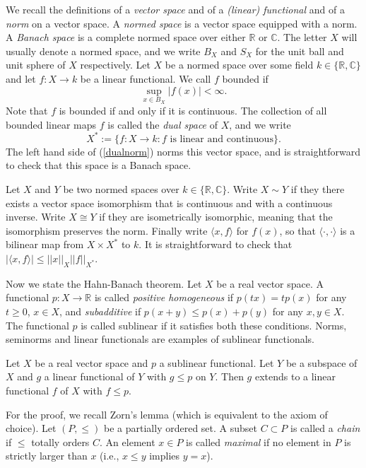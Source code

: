 We recall the definitions of a \emph{vector space} and of a \emph{(linear) functional} and of a \emph{norm} on a vector space.
A \emph{normed space} is a vector space equipped with a norm.
A \emph{Banach space} is a complete normed space over either $\mathbb{R}$ or $\mathbb{C}$.
The letter $X$ will usually denote a normed space,
and we write $B_X$ and $S_X$ for the unit ball and unit sphere of $X$ respectively.
Let $X$ be a normed space over some field $k\in\{\mathbb{R},\mathbb{C}\}$
and let $f:X\to k$ be a linear functional.
We call $f$ bounded if
\begin{equation}
  \sup_{x\in B_X}|f(x)|<\infty.
  \label{dualnorm}
\end{equation}
Note that $f$ is bounded if and only if it is continuous.
The collection of all bounded linear maps $f$ is called the \emph{dual space} of $X$,
and we write
$$X^*:=\{f:X\to k:\text{$f$ is linear and continuous}\}.$$
The left hand side of (\ref{dualnorm}) norms this vector space,
and is straightforward to check that this space is a Banach space.


Let $X$ and $Y$ be two normed spaces over $k\in\{\mathbb{R},\mathbb{C}\}$.
Write $X\sim Y$ if they there exists a vector space isomorphism that is continuous
and with a continuous inverse.
Write $X\cong Y$ if they are isometrically isomorphic, meaning that the isomorphism preserves
the norm.
Finally write $\langle x,f\rangle$ for $f(x)$, so that
$\langle\cdot,\cdot\rangle$ is a bilinear map from $X\times X^*$ to $k$.
It is straightforward to check that $|\langle x,f\rangle|\leq ||x||_X||f||_{X^*}$.

Now we state the Hahn-Banach theorem.
Let $X$ be a real vector space.
A functional $p:X\to \mathbb{R}$ is called
\emph{positive homogeneous} if $p(tx)=tp(x)$ for any $t\geq 0$, $x\in X$,
and \emph{subadditive} if $p(x+y)\leq p(x)+p(y)$ for any $x,y\in X$.
The functional $p$ is called sublinear if it satisfies both these conditions.
Norms, seminorms and linear functionals are examples of sublinear functionals.

\begin{theorem}
  Let $X$ be a real vector space and $p$ a sublinear functional.
  Let $Y$ be a subspace of $X$ and $g$ a linear functional of $Y$
  with $g\leq p$ on $Y$.
  Then $g$ extends to a linear functional $f$ of $X$ with $f\leq p$.
\end{theorem}

For the proof, we recall Zorn's lemma (which is equivalent to the axiom of choice).
Let $(P,\leq)$ be a partially ordered set.
A subset $C\subset P$ is called a \emph{chain} if $\leq$ totally orders $C$.
An element $x\in P$ is called \emph{maximal} if no element in $P$ is strictly larger than $x$
(i.e., $x\leq y$ implies $y=x$).

